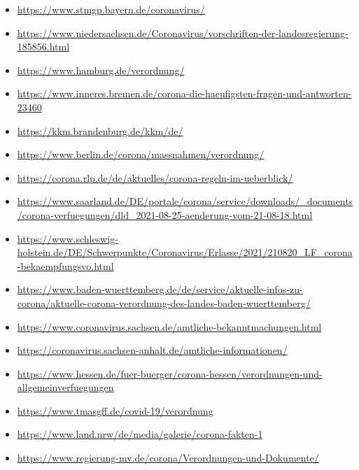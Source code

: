 \documentclass[12pt,oneside,a4paper,parskip]{scrbook}
\begin{document}
\begin{itemize}
\itemsep-1em
\item \url{https://www.stmgp.bayern.de/coronavirus/}
\item \url{https://www.niedersachsen.de/Coronavirus/vorschriften-der-landesregierung-185856.html}
\item \url{https://www.hamburg.de/verordnung/}
\item \url{https://www.inneres.bremen.de/corona-die-haeufigsten-fragen-und-antworten-23460}
\item \url{https://kkm.brandenburg.de/kkm/de/}
\item \url{https://www.berlin.de/corona/massnahmen/verordnung/}
\item \url{https://corona.rlp.de/de/aktuelles/corona-regeln-im-ueberblick/}
\item \url{https://www.saarland.de/DE/portale/corona/service/downloads/_documents/corona-verfuegungen/dld_2021-08-25-aenderung-vom-21-08-18.html}
\item \url{https://www.schleswig-holstein.de/DE/Schwerpunkte/Coronavirus/Erlasse/2021/210820_LF_corona-bekaempfungsvo.html}
\item \url{https://www.baden-wuerttemberg.de/de/service/aktuelle-infos-zu-corona/aktuelle-corona-verordnung-des-landes-baden-wuerttemberg/}
\item \url{https://www.coronavirus.sachsen.de/amtliche-bekanntmachungen.html}
\item \url{https://coronavirus.sachsen-anhalt.de/amtliche-informationen/}
\item \url{https://www.hessen.de/fuer-buerger/corona-hessen/verordnungen-und-allgemeinverfuegungen}
\item \url{https://www.tmasgff.de/covid-19/verordnung}
\item \url{https://www.land.nrw/de/media/galerie/corona-fakten-1}
\item \url{https://www.regierung-mv.de/corona/Verordnungen-und-Dokumente/}
\end{itemize}
\end{document}

